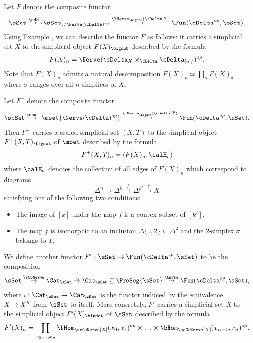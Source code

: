 \begin{notation}
Let $F$ denote the composite functor
$$ \sSet \stackrel{ \sdd}{\rightarrow} (\sSet)_{/ \Nerve(\cDelta)^{op} }
\stackrel{ \lNerve_{\bigdot}( \cDelta^{op} )}{\rightarrow} \Fun( \cDelta^{op}, \sSet).$$
Using Example , we can describe the functor $F$ as follows:
it carries a simplicial set $X$ to the simplicial object $F(X)_{\bigdot}$ described by the formula
$$ F(X)_{n} = \Nerve( \cDelta_{X} \times_{\cDelta} \cDelta_{[n]/})^{op}.$$
Note that $F(X)_{n}$ admits a natural descomposition $F(X)_n \simeq \coprod_{\sigma} F(X)_{\sigma}$,
where $\sigma$ ranges over all $n$-simplices of $X$.

Let $F^{+}$ denote the composite functor
$$ \scSet \stackrel{ \sdd^{+}}{\rightarrow} \mset{ \Nerve(\cDelta)^{op} }
\stackrel{ \lNerve^{+}_{\bigdot}( \cDelta^{op} )}{\rightarrow} \Fun( \cDelta^{op}, \mSet).$$
Then $F^{+}$ carries a scaled simplicial set $(X,T)$ to the simplicial object
$F^{+}(X,T)_{\bigdot}$ of $\mSet$ described by the formula
$$F^{+}(X,T)_{n} = (F(X)_n, \calE_{n})$$
where $\calE_{n}$ denotes the collection of all edges of $F(X)_n$ which correspond to diagrams
$$ \Delta^n \rightarrow \Delta^k \stackrel{f}{\rightarrow} \Delta^{k'} \stackrel{\sigma}{\rightarrow} X$$
satisfying one of the following two conditions:
\begin{itemize}
\item[$(a)$] The image of $[k]$ under the map $f$ is a convex subset of $[k']$.
\item[$(b)$] The map $f$ is isomorphic to an inclusion $\Delta{ \{0,2\} } \subseteq \Delta^2$
and the $2$-simplex $\sigma$ belongs to $T$.
\end{itemize}

We define another functor $F': \sSet \rightarrow \Fun( \cDelta^{op}, \sSet)$ to be the composition
$$ \sSet \stackrel{\sCoNerve}{\rightarrow} \Cat_{\sSet}
\stackrel{i}{\rightarrow} \Cat_{\sSet} \subseteq \PreSeg{\sSet} \stackrel{\UnPre}{\rightarrow}
\Fun( \cDelta^{op}, \sSet),$$
where $i: \Cat_{\sSet} \rightarrow \Cat_{\sSet}$ is the functor induced by the equivalence
$X \mapsto X^{op}$ from $\sSet$ to itself. More concretely, $F'$ carries a simplicial set
$X$ to the simplicial object $F'(X)_{\bigdot}$ of $\sSet$ described by the formula
$$ F'(X)_n = \coprod_{ x_0, \ldots, x_n} \bHom_{ \scCoNerve[X]}(x_0, x_1)^{op}
\times \ldots \times \bHom_{\scCoNerve[X]}( x_{n-1}, x_n)^{op}.$$


\end{notation}
